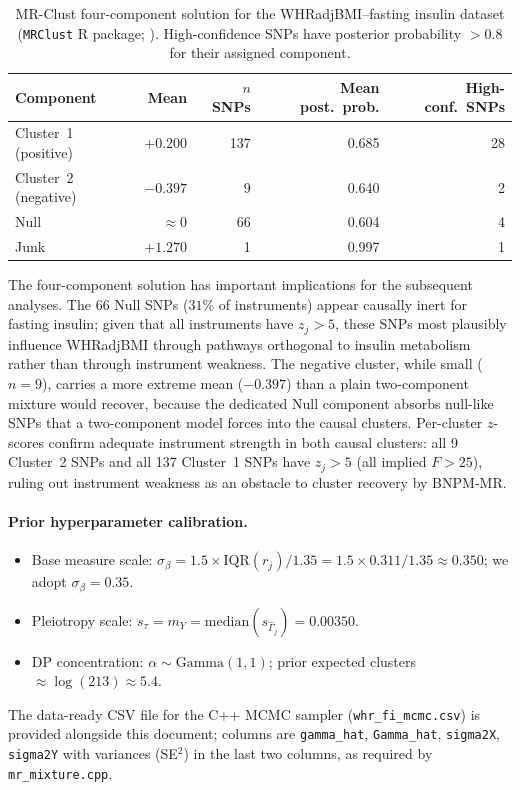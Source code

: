 \documentclass[12pt,a4paper]{article}
\begin{document}
\begin{table}[h!]
\centering
\caption{MR-Clust four-component solution for the WHRadjBMI--fasting
insulin dataset (\texttt{MRClust} R package; \citealp{Foley2019}).
High-confidence SNPs have posterior probability $> 0.8$ for their
assigned component.}
\label{tab:mrclust}
\small
\begin{tabular}{lrrrr}
\toprule
Component & Mean & $n$ SNPs & Mean post.\ prob. & High-conf.\ SNPs \\
\midrule
Cluster~1 (positive) & $+0.200$ & 137 & 0.685 & 28 \\
Cluster~2 (negative) & $-0.397$ &   9 & 0.640 &  2 \\
Null                 & $\approx 0$ &  66 & 0.604 &  4 \\
Junk                 & $+1.270$ &   1 & 0.997 &  1 \\
\bottomrule
\end{tabular}
\end{table}

The four-component solution has important implications for the
subsequent analyses.  The 66 Null SNPs ($31\%$ of instruments) appear
causally inert for fasting insulin; given that all instruments have
$z_{j} > 5$, these SNPs most plausibly influence WHRadjBMI through
pathways orthogonal to insulin metabolism rather than through instrument
weakness.  The negative cluster, while small ($n = 9$), carries a more
extreme mean ($-0.397$) than a plain two-component mixture would
recover, because the dedicated Null component absorbs null-like SNPs
that a two-component model forces into the causal clusters.  Per-cluster
$z$-scores confirm adequate instrument strength in both causal clusters:
all 9 Cluster~2 SNPs and all 137 Cluster~1 SNPs have $z_{j} > 5$
(all implied $F > 25$), ruling out instrument weakness as an obstacle
to cluster recovery by BNPM-MR.

\paragraph{Prior hyperparameter calibration.}
\begin{itemize}[leftmargin=2em]
  \item Base measure scale: $\sigma_{\beta} = 1.5 \times
        \mathrm{IQR}(r_{j})/1.35
        = 1.5 \times 0.311/1.35 \approx 0.350$; we adopt
        $\sigma_{\beta} = 0.35$.
  \item Pleiotropy scale: $s_{\tau} = m_{Y} =
        \mathrm{median}(s_{\hat{\Gamma}_{j}}) = 0.00350$.
  \item DP concentration: $\alpha \sim \mathrm{Gamma}(1,1)$; prior
        expected clusters $\approx \log(213) \approx 5.4$.
\end{itemize}
The data-ready CSV file for the C++ MCMC sampler
(\texttt{whr\_fi\_mcmc.csv}) is provided alongside this document;
columns are \texttt{gamma\_hat}, \texttt{Gamma\_hat}, \texttt{sigma2X},
\texttt{sigma2Y} with variances (SE$^{2}$) in the last two columns, as
required by \texttt{mr\_mixture.cpp}.
\end{document}
